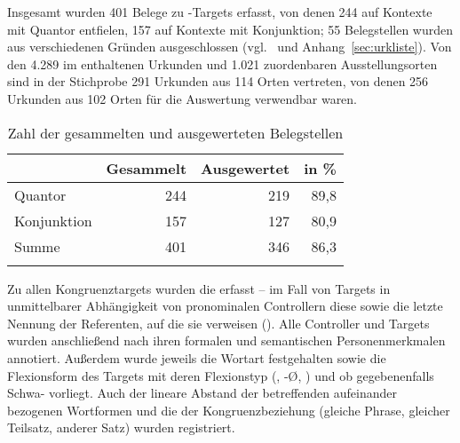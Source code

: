 \label{phsec:caohiatus}

Insgesamt wurden 401 Belege zu -Targets erfasst, von
denen 244 auf Kontexte mit Quantor entfielen, 157 auf Kontexte mit Konjunktion;
55 Belegstellen wurden aus verschiedenen Gründen ausgeschlossen
(vgl.~ und Anhang~\ref{sec:urkliste}). Von den 4.289 im
\CAO{} enthaltenen Urkunden und 1.021 zuordenbaren
Ausstellungsorten sind in der Stichprobe 291 Urkunden aus 114 Orten
vertreten, von denen 256 Urkunden aus 102 Orten
für die Auswertung verwendbar waren.

\begin{table}
\centering
\caption{Zahl der gesammelten und ausgewerteten Belegstellen}
\begin{tabular}{l r r r}
\lsptoprule

%
	& Gesammelt
	& Ausgewertet
	& in \%
	\\

\midrule


Quantor
	& 244 %
	& 219 %
	& 89,8 %
	\\

Konjunktion
	& 157 %
	& 127 %
	& 80,9 %
	\\

\midrule

Summe
	& 401 %
	& 346 %
	& 86,3 %
	\\

\lspbottomrule
\end{tabular}
\label{tab:ausgewcao}
\end{table}

Zu allen Kongruenztargets wurden die  erfasst -- im
Fall von Targets in unmittelbarer Abhängigkeit von pronominalen Controllern
diese sowie die letzte Nennung der Referenten, auf die sie
verweisen (). Alle
Controller und Targets wurden anschließend nach ihren
formalen und semantischen
Personenmerkmalen annotiert.
Außerdem wurde jeweils die Wortart festgehalten sowie die Flexionsform des
Targets mit deren Flexionstyp (, -Ø, ) und ob gegebenenfalls
Schwa- vorliegt. Auch der lineare Abstand der
betreffenden aufeinander bezogenen Wortformen und die  der
Kongruenzbeziehung (gleiche Phrase, gleicher Teilsatz,
anderer Satz) wurden registriert.

